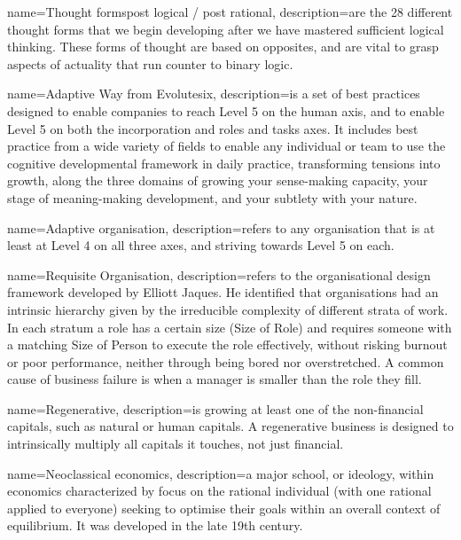 {
  name=Thought forms\textemdash post logical / post rational,
  description={are the 28 different thought forms that we begin developing after we have mastered sufficient logical thinking. These forms of thought are based on opposites, and are vital to grasp aspects of actuality that run counter to binary logic.}
}




{
  name=Adaptive Way from Evolutesix,
  description={is a set of best practices designed to enable companies to reach Level 5 on the human axis, and to enable Level 5 on both the incorporation and roles and tasks axes. It includes best practice from a wide variety of fields to enable any individual or team to use the cognitive developmental framework in daily practice, transforming tensions into growth, along the three domains of growing your sense\hyp{}making capacity, your stage of meaning\hyp{}making development, and your subtlety with your nature.}
}




{
  name=Adaptive organisation,
  description={refers to any organisation that is at least at Level 4 on all three axes, and striving towards Level 5 on each.}
}




{
  name=Requisite Organisation,
  description={refers to the organisational design framework developed by Elliott Jaques. He identified that organisations had an intrinsic hierarchy given by the irreducible complexity of different strata of work. In each stratum a role has a certain size (Size of Role) and requires someone with a matching Size of Person to execute the role effectively, without risking burnout or poor performance, neither through being bored nor overstretched. A common cause of business failure is when a manager is smaller than the role they fill.  }
}




{
  name=Regenerative,
  description={is growing at least one of the non-financial capitals, such as natural or human capitals. A regenerative business is designed to intrinsically multiply all capitals it touches, not just financial.}
}




{
  name=Neoclassical economics,
  description={a major school, or ideology, within economics characterized by focus on the rational individual (with one rational applied to everyone) seeking to optimise their goals within an overall context of equilibrium. It was developed in the late 19th century.}
}




